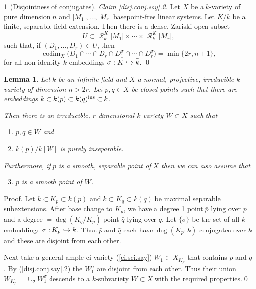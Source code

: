 \documentclass{amsart}
\newtheorem{lem}[thm]{Lemma}
\theoremstyle{definition}
\newtheorem{say}[thm]{}
\theoremstyle{remark}
\newcommand{\codim}[0]{\operatorname{codim}}
\newcommand{\res}[0]{\operatorname{\mathcal R}}
\def\into{\DOTSB\lhook\joinrel\to}
\begin{document}
\begin{say}[Disjointness of conjugates]
\medskip
{\it Claim \ref{disj.conj.say}.2.} Let $X$ be a $k$-variety of pure dimension $n$
and $|M_1|, \dots, |M_r|$ basepoint-free linear systems.  Let $K/k$ be  a finite, separable field extension.  Then  there is a dense, Zariski open subset 
$$
U\subset \res^K_k |M_1|\times\cdots\times   \res^K_k |M_r|,
$$
such that, if $(D_1, \dots, D_r)\in U$, then 
$$
\codim_X \bigl(D_1\cap \cdots\cap D_r\cap D_1^\sigma\cap \cdots\cap D_r^\sigma\bigr)=\min\{2r,n+1\},
$$
for all non-identity $k$-embeddings $\sigma:K\into \bar k$. \qed
\medskip
\end{say}
 

\begin{lem}\label{ZW.H.link.prop.1p.cor.3.lem}
Let $k$ be an infinite  field  and 
 $X$  a  normal, projective, irreducible  $k$-variety of dimension $n>2r$. 
Let  $p,q\in X$  be  closed points
such that there are embeddings  $k\subset k(p)\subset k(q)^{\rm ins}\subset \bar k$. 

Then there is an irreducible, $r$-dimensional  $k$-variety  $W\subset X$ such that 
\begin{enumerate}
\item $p, q\in W$ and 
\item  $k(p)/k[W]$ is purely inseparable.
\end{enumerate}
Furthermore, if $p$ is a smooth, separable  point of $X$ then we can also assume that 
\begin{enumerate}\setcounter{enumi}{2}
\item $p$ is a smooth point of $W$.
\end{enumerate}
\end{lem}

Proof. Let $k\subset K_p\subset k(p)$ and
$k\subset K_q\subset k(q)$ be maximal separable subextensions.
After base change to $K_p$, we have a degree 1 point $\bar p$ lying over $p$ and a degree $=\deg (K_q/K_p)$  point $\bar q$ lying over $q$. 
Let $\{\sigma\}$ be the set of all $k$-embeddings
$\sigma:K_p\into \bar k$. 
Thus $\bar p$ and $\bar q$ each have  $\deg (K_p:k)$ conjugates over $k$ and these are disjoint from each other.

Next  take a general ample-ci variety   (\ref{ci.sci.say})  $W_1\subset X_{K_p}$ that contains
$\bar p$ and $\bar q$.  By (\ref{disj.conj.say}.2) 
the $W_1^\sigma$ are disjoint from each other. Thus their union
$W_{K_p}=\cup_{\sigma}W_1^\sigma$  descends to a $k$-subvariety $W\subset X$
with the required properties.\qed

 
\end{document}

